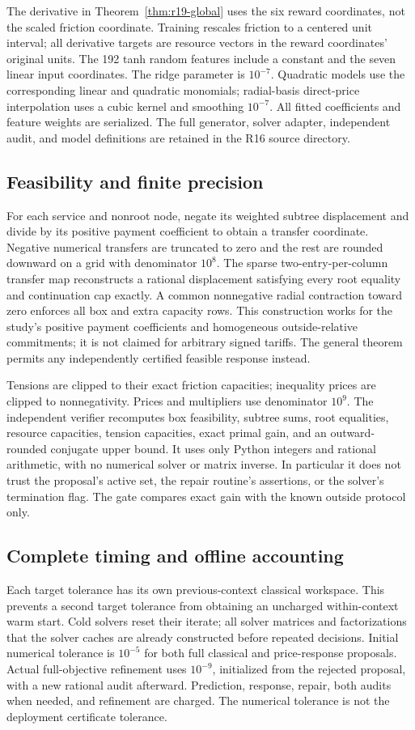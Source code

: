 \documentclass[11pt,letterpaper]{article}
\theoremstyle{definition}
\newcommand{\1}{\mathbf 1}
\begin{document}
The derivative in Theorem~\ref{thm:r19-global} uses the six reward coordinates, not the scaled friction coordinate. Training rescales friction to a centered unit interval; all derivative targets are resource vectors in the reward coordinates' original units. The 192 tanh random features include a constant and the seven linear input coordinates. The ridge parameter is $10^{-7}$. Quadratic models use the corresponding linear and quadratic monomials; radial-basis direct-price interpolation uses a cubic kernel and smoothing $10^{-7}$. All fitted coefficients and feature weights are serialized. The full generator, solver adapter, independent audit, and model definitions are retained in the R16 source directory.

\subsection{Feasibility and finite precision}
For each service and nonroot node, negate its weighted subtree displacement and divide by its positive payment coefficient to obtain a transfer coordinate. Negative numerical transfers are truncated to zero and the rest are rounded downward on a grid with denominator $10^8$. The sparse two-entry-per-column transfer map reconstructs a rational displacement satisfying every root equality and continuation cap exactly. A common nonnegative radial contraction toward zero enforces all box and extra capacity rows. This construction works for the study's positive payment coefficients and homogeneous outside-relative commitments; it is not claimed for arbitrary signed tariffs. The general theorem permits any independently certified feasible response instead.

Tensions are clipped to their exact friction capacities; inequality prices are clipped to nonnegativity. Prices and multipliers use denominator $10^9$. The independent verifier recomputes box feasibility, subtree sums, root equalities, resource capacities, tension capacities, exact primal gain, and an outward-rounded conjugate upper bound. It uses only Python integers and rational arithmetic, with no numerical solver or matrix inverse. In particular it does not trust the proposal's active set, the repair routine's assertions, or the solver's termination flag. The gate compares exact gain with the known outside protocol only.

\subsection{Complete timing and offline accounting}
Each target tolerance has its own previous-context classical workspace. This prevents a second target tolerance from obtaining an uncharged within-context warm start. Cold solvers reset their iterate; all solver matrices and factorizations that the solver caches are already constructed before repeated decisions. Initial numerical tolerance is $10^{-5}$ for both full classical and price-response proposals. Actual full-objective refinement uses $10^{-9}$, initialized from the rejected proposal, with a new rational audit afterward. Prediction, response, repair, both audits when needed, and refinement are charged. The numerical tolerance is not the deployment certificate tolerance.
\end{document}
